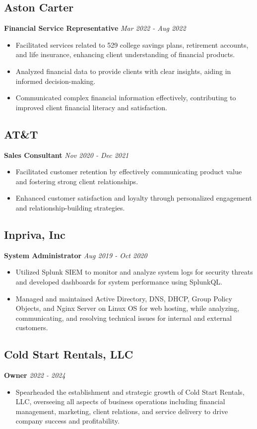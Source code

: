 \documentclass[a4paper,10pt]{article}
\begin{document}
\subsection{Aston Carter}
\textbf{Financial Service Representative} \hfill \textit{Mar 2022 - Aug 2022}  
\begin{itemize}[leftmargin=*]
    \item Facilitated services related to 529 college savings plans, retirement accounts, and life insurance, enhancing client understanding of financial products.
    \item Analyzed financial data to provide clients with clear insights, aiding in informed decision-making.
    \item Communicated complex financial information effectively, contributing to improved client financial literacy and satisfaction.
\end{itemize}

\subsection{AT\&T}
\textbf{Sales Consultant} \hfill \textit{Nov 2020 - Dec 2021}  
\begin{itemize}[leftmargin=*]
    \item Facilitated customer retention by effectively communicating product value and fostering strong client relationships.
    \item Enhanced customer satisfaction and loyalty through personalized engagement and relationship-building strategies.
\end{itemize}

\subsection{Inpriva, Inc}
\textbf{System Administrator} \hfill \textit{Aug 2019 - Oct 2020}  
\begin{itemize}[leftmargin=*]
    \item Utilized Splunk SIEM to monitor and analyze system logs for security threats and developed dashboards for system performance using SplunkQL.
    \item Managed and maintained Active Directory, DNS, DHCP, Group Policy Objects, and Nginx Server on Linux OS for web hosting, while analyzing, communicating, and resolving technical issues for internal and external customers.
\end{itemize}

\subsection{Cold Start Rentals, LLC}
\textbf{Owner} \hfill \textit{2022 - 2024}  
\begin{itemize}[leftmargin=*]
    \item Spearheaded the establishment and strategic growth of Cold Start Rentals, LLC, overseeing all aspects of business operations including financial management, marketing, client relations, and service delivery to drive company success and profitability.
\end{itemize}
\end{document}
